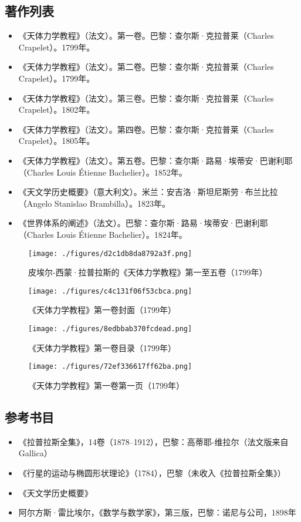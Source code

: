 \subsection{著作列表}  
\begin{itemize}
\item 《天体力学教程》（法文）。第一卷。巴黎：查尔斯·克拉普莱（Charles Crapelet）。1799年。  
\item 《天体力学教程》（法文）。第二卷。巴黎：查尔斯·克拉普莱（Charles Crapelet）。1799年。  
\item 《天体力学教程》（法文）。第三卷。巴黎：查尔斯·克拉普莱（Charles Crapelet）。1802年。  
\item 《天体力学教程》（法文）。第四卷。巴黎：查尔斯·克拉普莱（Charles Crapelet）。1805年。  
\item 《天体力学教程》（法文）。第五卷。巴黎：查尔斯·路易·埃蒂安·巴谢利耶（Charles Louis Étienne Bachelier）。1852年。  
\item 《天文学历史概要》（意大利文）。米兰：安吉洛·斯坦尼斯劳·布兰比拉（Angelo Stanislao Brambilla）。1823年。  
\item 《世界体系的阐述》（法文）。巴黎：查尔斯·路易·埃蒂安·巴谢利耶（Charles Louis Étienne Bachelier）。1824年。
\end{itemize}
\begin{figure}[ht]
\centering
\texttt{[image: ./figures/d2c1db8da8792a3f.png]}
\caption{皮埃尔-西蒙·拉普拉斯的《天体力学教程》第一至五卷（1799年）} \label{fig_LPLS_13}
\end{figure}
\begin{figure}[ht]
\centering
\texttt{[image: ./figures/c4c131f06f53cbca.png]}
\caption{《天体力学教程》第一卷封面（1799年）} \label{fig_LPLS_14}
\end{figure}
\begin{figure}[ht]
\centering
\texttt{[image: ./figures/8edbbab370fcdead.png]}
\caption{《天体力学教程》第一卷目录（1799年）} \label{fig_LPLS_15}
\end{figure}
\begin{figure}[ht]
\centering
\texttt{[image: ./figures/72ef336617ff62ba.png]}
\caption{《天体力学教程》第一卷第一页（1799年）} \label{fig_LPLS_16}
\end{figure}
\subsection{参考书目}  
\begin{itemize}
\item 《拉普拉斯全集》，14卷（1878–1912），巴黎：高蒂耶-维拉尔（法文版来自Gallica）  
\item 《行星的运动与椭圆形状理论》（1784），巴黎（未收入《拉普拉斯全集》）  
\item 《天文学历史概要》  
\item 阿尔方斯·雷比埃尔，《数学与数学家》，第三版，巴黎：诺尼与公司，1898年
\end{itemize}
